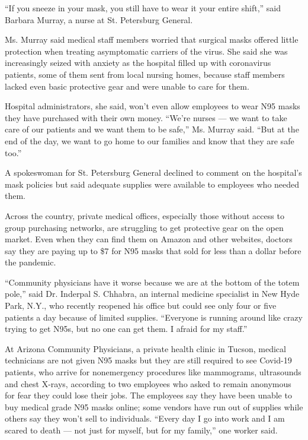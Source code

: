 ``If you sneeze in your mask, you still have to wear it your entire
shift,'' said Barbara Murray, a nurse at St. Petersburg General.

Ms. Murray said medical staff members worried that surgical masks
offered little protection when treating asymptomatic carriers of the
virus. She said she was increasingly seized with anxiety as the hospital
filled up with coronavirus patients, some of them sent from local
nursing homes, because staff members lacked even basic protective gear
and were unable to care for them.

Hospital administrators, she said, won't even allow employees to wear
N95 masks they have purchased with their own money. ``We're nurses ---
we want to take care of our patients and we want them to be safe,'' Ms.
Murray said. ``But at the end of the day, we want to go home to our
families and know that they are safe too.''

A spokeswoman for St. Petersburg General declined to comment on the
hospital's mask policies but said adequate supplies were available to
employees who needed them.

Across the country, private medical offices, especially those without
access to group purchasing networks, are struggling to get protective
gear on the open market. Even when they can find them on Amazon and
other websites, doctors say they are paying up to \$7 for N95 masks that
sold for less than a dollar before the pandemic.

``Community physicians have it worse because we are at the bottom of the
totem pole,'' said Dr. Inderpal S. Chhabra, an internal medicine
specialist in New Hyde Park, N.Y., who recently reopened his office but
could see only four or five patients a day because of limited supplies.
``Everyone is running around like crazy trying to get N95s, but no one
can get them. I afraid for my staff.''

At Arizona Community Physicians, a private health clinic in Tucson,
medical technicians are not given N95 masks but they are still required
to see Covid-19 patients, who arrive for nonemergency procedures like
mammograms, ultrasounds and chest X-rays, according to two employees who
asked to remain anonymous for fear they could lose their jobs. The
employees say they have been unable to buy medical grade N95 masks
online; some vendors have run out of supplies while others say they
won't sell to individuals. ``Every day I go into work and I am scared to
death --- not just for myself, but for my family,'' one worker said.

